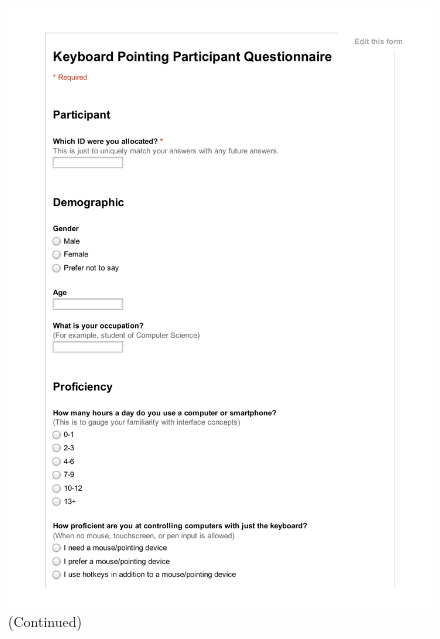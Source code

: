 \documentclass[11pt,openright,a4paper]{report}
\newcommand{\safefigheight}{\dimexpr\textheight-1.1\baselineskip-\abovecaptionskip-\belowcaptionskip\relax}
\begin{document}
\begin{figure}[ht]
\ContinuedFloat
\includegraphics[page=2,width=\textwidth,height=\safefigheight,keepaspectratio]{sheets/PreQuestionnaire.pdf}
\caption{ (Continued)}
\end{figure}
\end{document}
